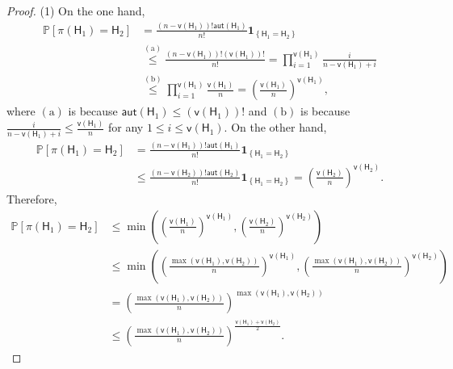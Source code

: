 \documentclass[letterpaper,11pt]{article}
\theoremstyle{definition}
\newcommand{\prob}[1]{ \mathbb{P}\left[ #1 \right] }
\newcommand{\vn}{\mathsf{{v}}}
\newcommand{\pth}[1]{\left( #1 \right)}
\newcommand{\sfH}{{\mathsf{H}}}
\newcommand{\indc}[1]{{\mathbf{1}_{\left\{{#1}\right\}}}}
\newcommand{\aut}{\mathsf{aut}}
\begin{document}
\begin{proof}
    (1) 
    On the one hand, \begin{align*}
        \prob{\pi(\sfH_1) = \sfH_2} &= \frac{(n-\vn(\sfH_1))!\aut(\sfH_1)}{n!} \indc{\sfH_1= \sfH_2}\\&\overset{\mathrm{(a)}}{\le} \frac{(n-\vn(\sfH_1))! (\vn(\sfH_1))!}{n!} = \prod_{i=1}^{\vn(\sfH_1)} \frac{i}{n-\vn(\sfH_1)+i}\\&\overset{\mathrm{(b)}}{\le} \prod_{i=1}^{\vn(\sfH_1)} \frac{\vn(\sfH_1)}{n} = \pth{\frac{\vn(\sfH_1)}{n}}^{\vn(\sfH_1)},
    \end{align*}
    where $\mathrm{(a)}$ is because $\aut(\sfH_1)\le (\vn(\sfH_1))!$ and $\mathrm{(b)}$ is because $\frac{i}{n-\vn(\sfH_1)+i}\le \frac{\vn(\sfH_1)}{n}$ for any $1\le i\le \vn(\sfH_1)$.
    On the other hand,
    \begin{align*}
        \prob{\pi(\sfH_1) = \sfH_2} &= \frac{(n-\vn(\sfH_1))!\aut(\sfH_1)}{n!} \indc{\sfH_1= \sfH_2}\\&\le\frac{(n-\vn(\sfH_2))!\aut(\sfH_2)}{n!} \indc{\sfH_1= \sfH_2}  = \pth{\frac{\vn(\sfH_2)}{n}}^{\vn(\sfH_2)}.
    \end{align*}
    Therefore,\begin{align*}
        \prob{\pi(\sfH_1) = \sfH_2}&\le \min\pth{\pth{\frac{\vn(\sfH_1)}{n}}^{\vn(\sfH_1)},\pth{\frac{\vn(\sfH_2)}{n}}^{\vn(\sfH_2)}}\\&\le\min\pth{\pth{\frac{\max\pth{\vn(\sfH_1),\vn(\sfH_2)}}{n}}^{\vn(\sfH_1)},\pth{\frac{\max\pth{\vn(\sfH_1),\vn(\sfH_2)}}{n}}^{\vn(\sfH_2)}} \\&=\pth{\frac{\max\pth{\vn(\sfH_1),\vn(\sfH_2)}}{n}}^{\max\pth{\vn(\sfH_1),\vn(\sfH_2)}}\\&\le   \pth{\frac{\max\pth{\vn(\sfH_1),\vn(\sfH_2)}}{n}}^{\frac{\vn(\sfH_1)+\vn(\sfH_2)}{2}}.
    \end{align*}


\end{proof}
\end{document}
